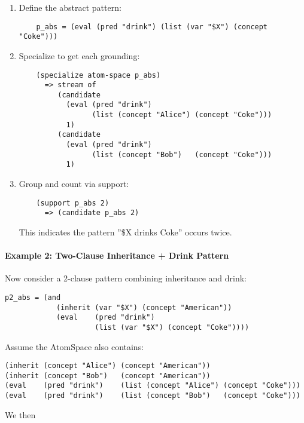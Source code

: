 \begin{enumerate}
\item  Define the abstract pattern:
    \begin{verbatim}
    p_abs = (eval (pred "drink") (list (var "$X") (concept "Coke")))
    \end{verbatim}

\item  Specialize to get each grounding:
    \begin{verbatim}
    (specialize atom-space p_abs)
      => stream of
         (candidate
           (eval (pred "drink")
                 (list (concept "Alice") (concept "Coke")))
           1)
         (candidate
           (eval (pred "drink")
                 (list (concept "Bob")   (concept "Coke")))
           1)
    \end{verbatim}

\item   Group and count via support:
    \begin{verbatim}
    (support p_abs 2)
      => (candidate p_abs 2)
    \end{verbatim}
    This indicates the pattern ''\$X drinks Coke'' occurs twice.
\end{enumerate}

\paragraph{Example 2: Two-Clause Inheritance + Drink Pattern}

Now consider a 2-clause pattern combining inheritance and drink:

\begin{verbatim}
p2_abs = (and
            (inherit (var "$X") (concept "American"))
            (eval    (pred "drink")
                     (list (var "$X") (concept "Coke"))))
\end{verbatim}

Assume the AtomSpace also contains:
\begin{verbatim}
(inherit (concept "Alice") (concept "American"))
(inherit (concept "Bob")   (concept "American"))
(eval    (pred "drink")    (list (concept "Alice") (concept "Coke")))
(eval    (pred "drink")    (list (concept "Bob")   (concept "Coke")))
\end{verbatim}

We then


